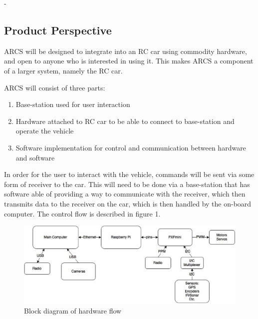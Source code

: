 -\documentclass[compsoc,draftclsnofoot,onecolumn,10pt]{IEEEtran}
\begin{document}
\subsection{Product Perspective} %
ARCS will be designed to integrate into an RC car using commodity hardware, and open to anyone who is interested in using it. This 
makes ARCS a component of a larger system, namely the RC car. \par
ARCS will consist of three parts: 
\begin{enumerate}
	\item Base-station used for user interaction
	\item Hardware attached to RC car to be able to connect to base-station and 
		operate the vehicle
	\item Software implementation for control and communication between hardware and software
\end{enumerate}
In order for the user to interact with the vehicle, commands will be sent via some form
of receiver to the car. This will need to be done via a base-station that has software able of
providing a way to communicate with the receiver, which then transmits data to the receiver on 
the car, which is then handled by the on-board computer. 
The control flow is described in figure 1. \\

\begin{figure}
  \centering
  \vspace{10cm}
  \includegraphics{Block_Diagram.eps}
  \caption{Block diagram of hardware flow}
\end{figure}

\end{document}
